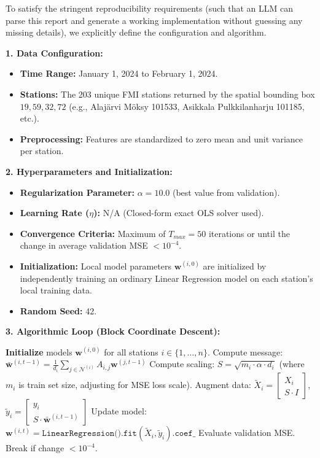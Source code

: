 \documentclass{article}
\begin{document}
To satisfy the stringent reproducibility requirements (such that an LLM can parse this report and generate a working implementation without guessing any missing details), we explicitly define the configuration and algorithm.

\textbf{1. Data Configuration:}
\begin{itemize}
    \item \textbf{Time Range:} January 1, 2024 to February 1, 2024.
    \item \textbf{Stations:} The 203 unique FMI stations returned by the spatial bounding box $19,59,32,72$ (e.g., Alaj\"arvi M\"oksy 101533, Asikkala Pulkkilanharju 101185, etc.).
    \item \textbf{Preprocessing:} Features are standardized to zero mean and unit variance per station.
\end{itemize}

\textbf{2. Hyperparameters and Initialization:}
\begin{itemize}
    \item \textbf{Regularization Parameter:} $\alpha = 10.0$ (best value from validation).
    \item \textbf{Learning Rate ($\eta$):} N/A (Closed-form exact OLS solver used).
    \item \textbf{Convergence Criteria:} Maximum of $T_{max} = 50$ iterations or until the change in average validation MSE $< 10^{-4}$.
    \item \textbf{Initialization:} Local model parameters $\mathbf{w}^{(i, 0)}$ are initialized by independently training an ordinary Linear Regression model on each station's local training data.
    \item \textbf{Random Seed:} 42.
\end{itemize}

\textbf{3. Algorithmic Loop (Block Coordinate Descent):}
\begin{algorithmic}[1]
\STATE \textbf{Initialize} models $\mathbf{w}^{(i, 0)}$ for all stations $i \in \{1,\ldots,n\}$.
        \STATE Compute message: $\mathbf{\bar{w}}^{(i, t-1)} = \frac{1}{d_i} \sum_{j \in \mathcal{N}^{(i)}} A_{i,j} \mathbf{w}^{(j, t-1)}$
        \STATE Compute scaling: $S = \sqrt{m_i \cdot \alpha \cdot d_i}$ (where $m_i$ is train set size, adjusting for MSE loss scale).
        \STATE Augment data: $\tilde{X}_i = \begin{bmatrix} X_i \\ S \cdot I \end{bmatrix}$, $\tilde{y}_i = \begin{bmatrix} y_i \\ S \cdot \mathbf{\bar{w}}^{(i, t-1)} \end{bmatrix}$
        \STATE Update model: $\mathbf{w}^{(i, t)} = \texttt{LinearRegression().fit}(\tilde{X}_i, \tilde{y}_i)\texttt{.coef\_}$
    \ENDFOR
    \STATE Evaluate validation MSE. Break if change $< 10^{-4}$.
\ENDFOR
\end{algorithmic}
\end{document}
